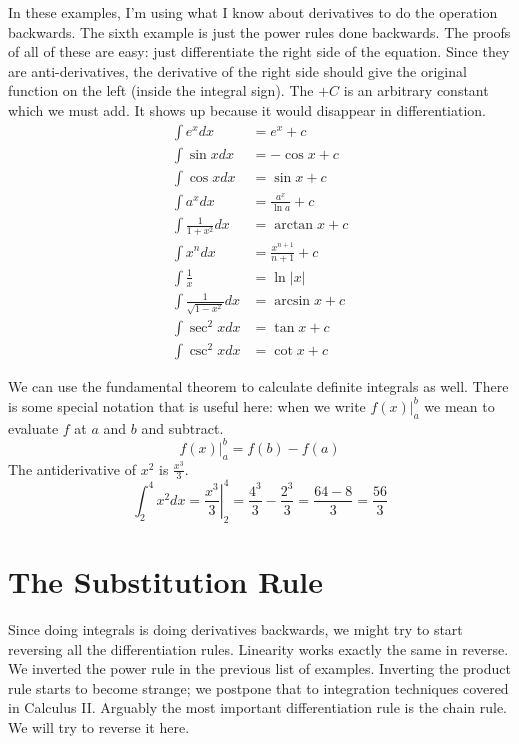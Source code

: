 \documentclass[fleqn]{report}
\begin{document}
\begin{example}
In these examples, I'm using what I
know about derivatives to do the operation backwards. 
The sixth example is just the power rules done
backwards. The proofs of all of these are easy: just
differentiate the right side of the equation. Since they are
anti-derivatives, the derivative of the right side should give
the original function on the left (inside the integral sign).
The $+C$ is an arbitrary constant which we must add. It shows
up because it would disappear in differentiation.
\begin{align*}
\int e^x dx & = e^x + c \\
\int \sin x dx & = -\cos x + c \\
\int \cos x dx & = \sin x + c \\
\int a^x dx & = \frac{a^x}{\ln a} + c \\
\int \frac{1}{1+x^2} dx & = \arctan x + c \\
\int x^n dx & = \frac{x^{n+1}}{n+1} + c \\
\int \frac{1}{x} & = \ln |x| \\
\int \frac{1}{\sqrt{1-x^2}} dx & = \arcsin x + c \\
\int \sec^2 x dx & = \tan x + c \\
\int \csc^2 x dx & = \cot x + c 
\end{align*}
\end{example}

\begin{example}
We can use the fundamental theorem to
calculate definite integrals as well. There is some special notation
that is useful here: when we write $\left. f(x)
\right|_a^b$ we mean to evaluate $f$ at $a$ and $b$ and
subtract. 
\begin{equation*}
\left. f(x) \right|_a^b = f(b) - f(a)
\end{equation*}
The antiderivative of $x^2$ is $\frac{x^3}{3}$.
\begin{equation*}
\int_2^4 x^2 dx = \left. \frac{x^3}{3} \right|_2^4 =
\frac{4^3}{3} - \frac{2^3}{3} = \frac{64 - 8}{3} = \frac{56}{3}
\end{equation*}
\end{example}

\section{The Substitution Rule}
\label{substitution-rule}

Since doing integrals is doing derivatives backwards, we might
try to start reversing all the differentiation rules.
Linearity works exactly the same in reverse.
We inverted the power rule in the previous list of
examples. Inverting the product rule starts to become
strange; we postpone that to integration techniques covered in
Calculus II. Arguably the most important differentiation rule is
the chain rule. We will try to reverse it here.
\end{document}
